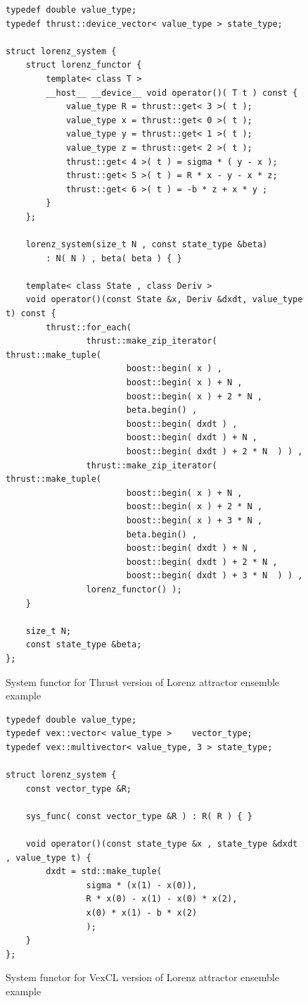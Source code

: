 \documentclass[1p]{elsarticle}
\begin{document}
\begin{figure}
\begin{lstlisting}
typedef double value_type;
typedef thrust::device_vector< value_type > state_type;

struct lorenz_system {
    struct lorenz_functor {
        template< class T >
        __host__ __device__ void operator()( T t ) const {
            value_type R = thrust::get< 3 >( t );
            value_type x = thrust::get< 0 >( t );
            value_type y = thrust::get< 1 >( t );
            value_type z = thrust::get< 2 >( t );
            thrust::get< 4 >( t ) = sigma * ( y - x );
            thrust::get< 5 >( t ) = R * x - y - x * z;
            thrust::get< 6 >( t ) = -b * z + x * y ;
        }
    };

    lorenz_system(size_t N , const state_type &beta)
        : N( N ) , beta( beta ) { }

    template< class State , class Deriv >
    void operator()(const State &x, Deriv &dxdt, value_type t) const {
        thrust::for_each(
                thrust::make_zip_iterator( thrust::make_tuple(
                        boost::begin( x ) ,
                        boost::begin( x ) + N ,
                        boost::begin( x ) + 2 * N ,
                        beta.begin() ,
                        boost::begin( dxdt ) ,
                        boost::begin( dxdt ) + N ,
                        boost::begin( dxdt ) + 2 * N  ) ) ,
                thrust::make_zip_iterator( thrust::make_tuple(
                        boost::begin( x ) + N ,
                        boost::begin( x ) + 2 * N ,
                        boost::begin( x ) + 3 * N ,
                        beta.begin() ,
                        boost::begin( dxdt ) + N ,
                        boost::begin( dxdt ) + 2 * N ,
                        boost::begin( dxdt ) + 3 * N  ) ) ,
                lorenz_functor() );
    }

    size_t N;
    const state_type &beta;
};
\end{lstlisting}
\caption{System functor for Thrust version of Lorenz attractor ensemble example}
\label{code:thrust:lorenz}
\end{figure}

\begin{figure}
\begin{lstlisting}
typedef double value_type;
typedef vex::vector< value_type >    vector_type;
typedef vex::multivector< value_type, 3 > state_type;

struct lorenz_system {
    const vector_type &R;

    sys_func( const vector_type &R ) : R( R ) { }

    void operator()(const state_type &x , state_type &dxdt , value_type t) {
        dxdt = std::make_tuple(
                sigma * (x(1) - x(0)),
                R * x(0) - x(1) - x(0) * x(2),
                x(0) * x(1) - b * x(2)
                );
    }
};
\end{lstlisting}
\caption{System functor for VexCL version of Lorenz attractor ensemble example}
\label{code:vexcl:lorenz}
\end{figure}
\end{document}
